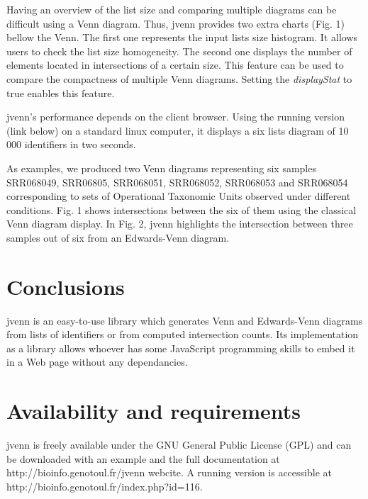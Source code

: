 \documentclass{bmcart}
\begin{document}
Having an overview of the list size and comparing multiple diagrams can be difficult using a Venn diagram. Thus, jvenn provides two extra charts (Fig. 1) 
bellow the Venn. The first one represents the input lists size histogram. It allows users to check the list size homogeneity. The second one displays 
the number of elements located in intersections of a certain size. This feature can be used to compare the compactness of multiple Venn diagrams. 
Setting the \textit{displayStat} to true enables this feature.

jvenn's performance depends on the client browser. Using the running version (link below) on a standard linux computer, it displays a six lists diagram of 
10 000 identifiers in two seconds.

As examples, we produced two Venn diagrams representing six samples SRR068049, SRR06805, SRR068051, SRR068052, SRR068053 and 
SRR068054 corresponding to sets of Operational Taxonomic Units observed under different conditions. Fig. 1 shows intersections
between the six of them using the classical Venn diagram display. In Fig. 2, jvenn highlights the intersection between three samples out of 
six from an Edwards-Venn diagram.


\section*{Conclusions}

jvenn is an easy-to-use library which generates Venn and Edwards-Venn diagrams from lists of identifiers or from computed intersection 
counts. Its implementation as a library allows whoever has some JavaScript programming skills to embed it in a Web page without any 
dependancies.

\section*{Availability and requirements}

jvenn is freely available under the GNU General Public License (GPL) and can be downloaded with an example and the full documentation
at http://bioinfo.genotoul.fr/jvenn  webcite. A running version is accessible at http://bioinfo.genotoul.fr/index.php?id=116.

\end{document}
